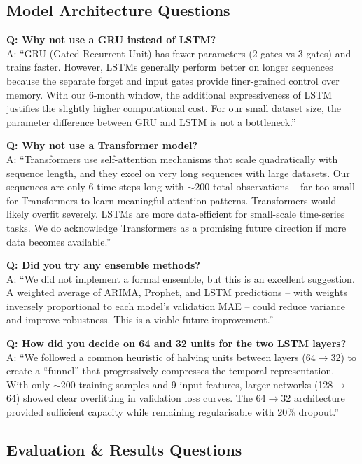 \documentclass[11pt,a4paper]{article}
\begin{document}
\subsection{Model Architecture Questions}

\textbf{Q: Why not use a GRU instead of LSTM?}\\
A: ``GRU (Gated Recurrent Unit) has fewer parameters (2 gates vs 3 gates) and trains faster. However, LSTMs generally perform better on longer sequences because the separate forget and input gates provide finer-grained control over memory. With our 6-month window, the additional expressiveness of LSTM justifies the slightly higher computational cost. For our small dataset size, the parameter difference between GRU and LSTM is not a bottleneck.''

\textbf{Q: Why not use a Transformer model?}\\
A: ``Transformers use self-attention mechanisms that scale quadratically with sequence length, and they excel on very long sequences with large datasets. Our sequences are only 6 time steps long with $\sim$200 total observations -- far too small for Transformers to learn meaningful attention patterns. Transformers would likely overfit severely. LSTMs are more data-efficient for small-scale time-series tasks. We do acknowledge Transformers as a promising future direction if more data becomes available.''

\textbf{Q: Did you try any ensemble methods?}\\
A: ``We did not implement a formal ensemble, but this is an excellent suggestion. A weighted average of ARIMA, Prophet, and LSTM predictions -- with weights inversely proportional to each model's validation MAE -- could reduce variance and improve robustness. This is a viable future improvement.''

\textbf{Q: How did you decide on 64 and 32 units for the two LSTM layers?}\\
A: ``We followed a common heuristic of halving units between layers (64$\rightarrow$32) to create a ``funnel'' that progressively compresses the temporal representation. With only $\sim$200 training samples and 9 input features, larger networks (128$\rightarrow$64) showed clear overfitting in validation loss curves. The 64$\rightarrow$32 architecture provided sufficient capacity while remaining regularisable with 20\% dropout.''

\subsection{Evaluation \& Results Questions}
\end{document}
